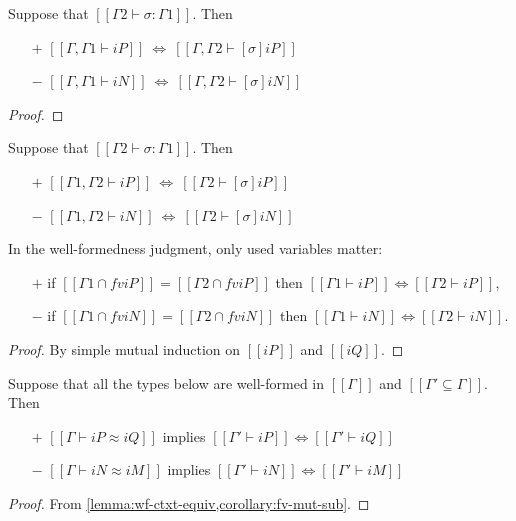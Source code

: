 \begin{lemma}
  \label{lemma:wf-subst}
  Suppose that $[[Γ2 ⊢ σ : Γ1]]$. Then
  \begin{itemize}
  \item[$+$] $[[Γ, Γ1 ⊢ iP]] ~\Leftrightarrow~ [[Γ, Γ2 ⊢ [σ]iP]]$
  \item[$-$] $[[Γ, Γ1 ⊢ iN]] ~\Leftrightarrow~ [[Γ, Γ2 ⊢ [σ]iN]]$
  \end{itemize}
\end{lemma}
\begin{proof}
\end{proof}


\begin{corollary}
  \label{lemma:wf-subst}
  Suppose that $[[Γ2 ⊢ σ : Γ1]]$. Then
  \begin{itemize}
  \item[$+$] $[[Γ1, Γ2 ⊢ iP]] ~\Leftrightarrow~ [[Γ2 ⊢ [σ]iP]]$
  \item[$-$] $[[Γ1, Γ2 ⊢ iN]] ~\Leftrightarrow~ [[Γ2 ⊢ [σ]iN]]$
  \end{itemize}
\end{corollary}

\begin{lemma}
  \label{lemma:wf-ctxt-equiv}
  In the well-formedness judgment, only used variables matter:
  \begin{itemize}
  \item[$+$] if $[[{Γ1} ∩ fv iP]] = [[{Γ2} ∩ fv iP]]$ then
    $[[Γ1 ⊢ iP]] \iff [[Γ2 ⊢ iP]]$,
  \item[$-$] if $[[{Γ1} ∩ fv iN]] = [[{Γ2} ∩ fv iN]]$ then
    $[[Γ1 ⊢ iN]] \iff [[Γ2 ⊢ iN]]$.
  \end{itemize}
\end{lemma}
\begin{proof}
  By simple mutual induction on $[[iP]]$ and $[[iQ]]$. 
\end{proof}

\begin{corollary}
  \label{lemma:mut-sub-types-wf-equiv}
  Suppose that all the types below are well-formed in $[[Γ]]$ and
  $[[{Γ'} ⊆ {Γ}]]$. Then
  \begin{itemize}
  \item[$+$] $[[Γ ⊢ iP ≈ iQ]]$ implies $[[Γ' ⊢ iP]] \iff [[Γ' ⊢ iQ]]$
  \item[$-$] $[[Γ ⊢ iN ≈ iM]]$ implies $[[Γ' ⊢ iN]] \iff [[Γ' ⊢ iM]]$
  \end{itemize}
\end{corollary}
\begin{proof}
  From \cref{lemma:wf-ctxt-equiv,corollary:fv-mut-sub}.
\end{proof}